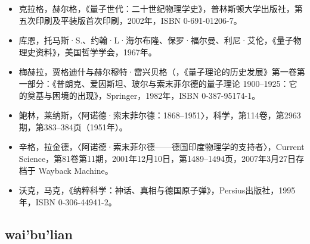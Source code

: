 \begin{itemize}
\item 克拉格，赫尔格，《量子世代：二十世纪物理学史》，普林斯顿大学出版社，第五次印刷及平装版首次印刷，2002年，ISBN 0-691-01206-7。
\item 库恩，托马斯·S.、约翰·L·海尔布隆、保罗·福尔曼、利尼·艾伦，《量子物理史资料》，美国哲学学会，1967年。
\item 梅赫拉，贾格迪什与赫尔穆特·雷兴贝格（，《量子理论的历史发展》第一卷第一部分：《普朗克、爱因斯坦、玻尔与索末菲尔德的量子理论 1900–1925：它的奠基与困境的出现》，Springer，1982年，ISBN 0-387-95174-1。
\item 鲍林，莱纳斯，〈阿诺德·索末菲尔德：1868–1951〉，科学，第114卷，第2963期，第383–384页（1951年）。
\item 辛格，拉金德，〈阿诺德·索末菲尔德——德国印度物理学的支持者〉，Current Science，第81卷第11期，2001年12月10日，第1489–1494页，2007年3月27日存档于 Wayback Machine。
\item 沃克，马克，《纳粹科学：神话、真相与德国原子弹》，Persius出版社，1995年，ISBN 0-306-44941-2。
\end{itemize}
\subsection{wai'bu'lian}
